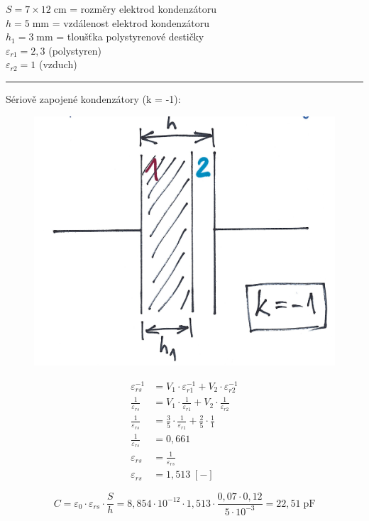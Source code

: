%
%

$S = 7 \times 12 \; \si{\centi\meter}$ = rozměry elektrod kondenzátoru\\
$h = 5 \; \si{\milli\meter}$ = vzdálenost elektrod kondenzátoru\\
$h_1 = 3 \; \si{\milli\meter}$ = tloušťka polystyrenové destičky\\
$\varepsilon_{r1} = 2,3$ (polystyren)\\
$\varepsilon_{r2} = 1$ (vzduch)\\
\noindent\rule{8cm}{0.4pt}

Sériově zapojené kondenzátory (k = -1):

\begin{figure}[h]
    \centering
    \includegraphics[width=.2\textwidth]{images/ul3_C1.jpg}
\end{figure}

\begin{align*}
    \varepsilon_{rs}^{-1} &= V_1 \cdot \varepsilon_{r1}^{-1} + V_2 \cdot \varepsilon_{r2}^{-1} \\
    \frac{1}{\varepsilon_{rs}} &= V_1 \cdot \frac{1}{\varepsilon_{r1}} + V_2 \cdot \frac{1}{\varepsilon_{r2}} \\
    \frac{1}{\varepsilon_{rs}} &= \frac{3}{5} \cdot \frac{1}{\varepsilon_{r1}} + \frac{2}{5} \cdot \frac{1}{1} \\
    \frac{1}{\varepsilon_{rs}} &= 0,661 \\
    \varepsilon_{rs} &= \frac{1}{\varepsilon_{rs}} \\
    \varepsilon_{rs} &= 1,513 \; [-]
\end{align*}

\begin{equation*}
    C = \varepsilon_0 \cdot \varepsilon_{rs} \cdot \frac{S}{h} = 8,854 \cdot 10^{-12} \cdot 1,513 \cdot \frac{0,07 \cdot 0,12}{5 \cdot 10^{-3}} = 22,51 \; \si{\pico\farad}
\end{equation*}

